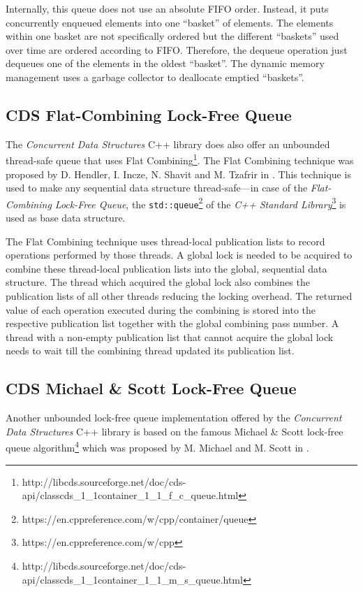 	Internally, this queue does not use an absolute FIFO order. Instead, it puts concurrently enqueued elements into one ``basket'' of elements. The elements within one basket are not specifically ordered but the different ``baskets'' used over time are ordered according to FIFO. Therefore, the dequeue operation just dequeues one of the elements in the oldest ``basket''. The dynamic memory management uses a garbage collector to deallocate emptied ``baskets''.

\subsection[CDS FCQueue]{CDS Flat-Combining Lock-Free Queue} \label{subsec:cds-fc}

	The \textit{Concurrent Data Structures} C++ library does also offer an unbounded thread-safe queue that uses Flat Combining\footnote{http://libcds.sourceforge.net/doc/cds-api/classcds\_1\_1container\_1\_1\_f\_c\_queue.html}. The Flat Combining technique was proposed by D. Hendler, I. Incze, N. Shavit and M. Tzafrir in \cite{Hendler:2010}.  This technique is used to make any sequential data structure thread-safe---in case of the \emph{Flat-Combining Lock-Free Queue}, the \lstinline{std::queue}\footnote{https://en.cppreference.com/w/cpp/container/queue} of the \textit{C++ Standard Library}\footnote{https://en.cppreference.com/w/cpp} is used as base data structure.
	
	The Flat Combining technique uses thread-local publication lists to record operations performed by those threads. A global lock is needed to be acquired to combine these thread-local publication lists into the global, sequential data structure. The thread which acquired the global lock also combines the publication lists of all other threads reducing the locking overhead. The returned value of each operation executed during the combining is stored into the respective publication list together with the global combining pass number. A thread with a non-empty publication list that cannot acquire the global lock needs to wait till the combining thread updated its publication list.

\subsection[CDS MSQueue]{CDS Michael \& Scott Lock-Free Queue} \label{subsec:cds-ms}

	Another unbounded lock-free queue implementation offered by the \textit{Concurrent Data Structures} C++ library is based on the famous Michael \& Scott lock-free queue algorithm\footnote{http://libcds.sourceforge.net/doc/cds-api/classcds\_1\_1container\_1\_1\_m\_s\_queue.html} which was proposed by M. Michael and M. Scott in \cite{Michael:1996}.
	
